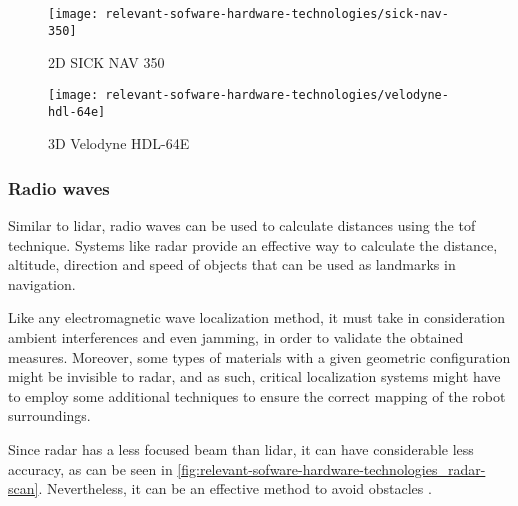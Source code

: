 \begin{savenotes}
\begin{figure}[H]
	\centering
	\begin{minipage}[h]{.47\textwidth}
		\centering
		\texttt{[image: relevant-sofware-hardware-technologies/sick-nav-350]}
		\caption[2D SICK NAV 350]{2D SICK NAV 350\protect\footnotemark}
		\label{fig:relevant-sofware-hardware-technologies_sick-nav-350}
	\end{minipage}\hfill
{}
	\begin{minipage}[h]{.47\textwidth}
		\centering
		\texttt{[image: relevant-sofware-hardware-technologies/velodyne-hdl-64e]}
		\caption[3D Velodyne HDL-64E]{3D Velodyne HDL-64E\protect\footnotemark}
		\label{fig:relevant-sofware-hardware-technologies_velodyne-hdl-64e}
	\end{minipage}
\end{figure}
\end{savenotes}


\subsubsection{Radio waves}

Similar to \gls{lidar}, radio waves can be used to calculate distances using the \gls{tof} technique. Systems like \gls{radar} provide an effective way to calculate the distance, altitude, direction and speed of objects that can be used as landmarks in navigation.

Like any electromagnetic wave localization method, it must take in consideration ambient interferences and even jamming, in order to validate the obtained measures. Moreover, some types of materials with a given geometric configuration might be invisible to \gls{radar}, and as such, critical localization systems might have to employ some additional techniques to ensure the correct mapping of the robot surroundings.

Since \gls{radar} has a less focused beam than \gls{lidar}, it can have considerable less accuracy, as can be seen in \cref{fig:relevant-sofware-hardware-technologies_radar-scan}. Nevertheless, it can be an effective method to avoid obstacles \cite{Wu2007}.


